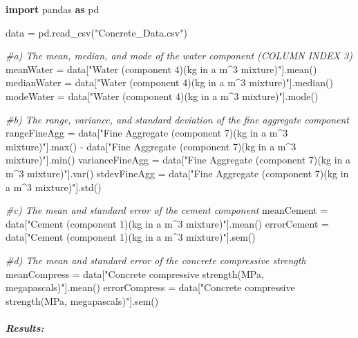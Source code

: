 \documentclass[
]{article}
\newenvironment{Shaded}{}{}
\newcommand{\BuiltInTok}[1]{\textcolor[rgb]{0.00,0.50,0.00}{#1}}
\newcommand{\CommentTok}[1]{\textcolor[rgb]{0.38,0.63,0.69}{\textit{#1}}}
\newcommand{\ImportTok}[1]{\textcolor[rgb]{0.00,0.50,0.00}{\textbf{#1}}}
\newcommand{\NormalTok}[1]{#1}
\newcommand{\OperatorTok}[1]{\textcolor[rgb]{0.40,0.40,0.40}{#1}}
\newcommand{\StringTok}[1]{\textcolor[rgb]{0.25,0.44,0.63}{#1}}
\begin{document}
\begin{Shaded}
\begin{Highlighting}[]
\ImportTok{import}\NormalTok{ pandas }\ImportTok{as}\NormalTok{ pd}

\NormalTok{data }\OperatorTok{=}\NormalTok{ pd.read\_csv(}\StringTok{"Concrete\_Data.csv"}\NormalTok{)}

\CommentTok{\#a) The mean, median, and mode of the water component (COLUMN INDEX 3)}
\NormalTok{meanWater }\OperatorTok{=}\NormalTok{ data[}\StringTok{"Water  (component 4)(kg in a m\^{}3 mixture)"}\NormalTok{].mean()}
\NormalTok{medianWater }\OperatorTok{=}\NormalTok{ data[}\StringTok{"Water  (component 4)(kg in a m\^{}3 mixture)"}\NormalTok{].median()}
\NormalTok{modeWater }\OperatorTok{=}\NormalTok{ data[}\StringTok{"Water  (component 4)(kg in a m\^{}3 mixture)"}\NormalTok{].mode()}

\CommentTok{\#b) The range, variance, and standard deviation of the fine aggregate component}
\NormalTok{rangeFineAgg }\OperatorTok{=}\NormalTok{ data[}\StringTok{"Fine Aggregate (component 7)(kg in a m\^{}3 mixture)"}\NormalTok{].}\BuiltInTok{max}\NormalTok{() }\OperatorTok{{-}}\NormalTok{ data[}\StringTok{"Fine Aggregate (component 7)(kg in a m\^{}3 mixture)"}\NormalTok{].}\BuiltInTok{min}\NormalTok{()}
\NormalTok{varianceFineAgg }\OperatorTok{=}\NormalTok{ data[}\StringTok{"Fine Aggregate (component 7)(kg in a m\^{}3 mixture)"}\NormalTok{].var()}
\NormalTok{stdevFineAgg }\OperatorTok{=}\NormalTok{ data[}\StringTok{"Fine Aggregate (component 7)(kg in a m\^{}3 mixture)"}\NormalTok{].std()}

\CommentTok{\#c) The mean and standard error of the cement component}
\NormalTok{meanCement }\OperatorTok{=}\NormalTok{ data[}\StringTok{"Cement (component 1)(kg in a m\^{}3 mixture)"}\NormalTok{].mean()}
\NormalTok{errorCement }\OperatorTok{=}\NormalTok{ data[}\StringTok{"Cement (component 1)(kg in a m\^{}3 mixture)"}\NormalTok{].sem()}

\CommentTok{\#d) The mean and standard error of the concrete compressive strength}
\NormalTok{meanCompress }\OperatorTok{=}\NormalTok{ data[}\StringTok{"Concrete compressive strength(MPa, megapascals)"}\NormalTok{].mean()}
\NormalTok{errorCompress }\OperatorTok{=}\NormalTok{ data[}\StringTok{"Concrete compressive strength(MPa, megapascals)"}\NormalTok{].sem()}
\end{Highlighting}
\end{Shaded}

\hypertarget{results}{%
\paragraph{\texorpdfstring{\textbf{\emph{Results:}}}{Results:}}\label{results}}
\end{document}
